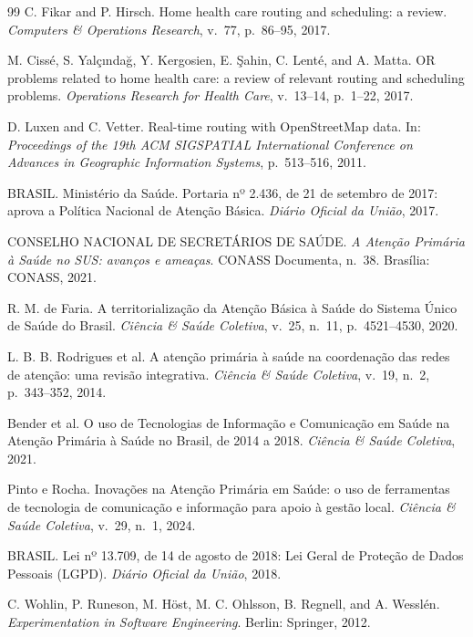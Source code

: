 \documentclass[11pt,a4paper]{article}
\begin{document}
\begin{thebibliography}{99}
C. Fikar and P. Hirsch.
Home health care routing and scheduling: a review. \textit{Computers \& Operations Research}, v.~77, p.~86--95, 2017.

M. Cissé, S. Yalçındağ, Y. Kergosien, E. Şahin, C. Lenté, and A. Matta.
OR problems related to home health care: a review of relevant routing and scheduling problems. \textit{Operations Research for Health Care}, v.~13--14, p.~1--22, 2017.

D. Luxen and C. Vetter.
Real-time routing with OpenStreetMap data. In: \textit{Proceedings of the 19th ACM SIGSPATIAL International Conference on Advances in Geographic Information Systems}, p.~513--516, 2011.

BRASIL. Ministério da Saúde.
Portaria nº 2.436, de 21 de setembro de 2017: aprova a Política Nacional de Atenção Básica. \textit{Diário Oficial da União}, 2017.

CONSELHO NACIONAL DE SECRETÁRIOS DE SAÚDE.
\textit{A Atenção Primária à Saúde no SUS: avanços e ameaças}. CONASS Documenta, n.~38. Brasília: CONASS, 2021.

R. M. de Faria.
A territorialização da Atenção Básica à Saúde do Sistema Único de Saúde do Brasil. \textit{Ciência \& Saúde Coletiva}, v.~25, n.~11, p.~4521--4530, 2020.

L. B. B. Rodrigues et al.
A atenção primária à saúde na coordenação das redes de atenção: uma revisão integrativa. \textit{Ciência \& Saúde Coletiva}, v.~19, n.~2, p.~343--352, 2014.

Bender et al.
O uso de Tecnologias de Informação e Comunicação em Saúde na Atenção Primária à Saúde no Brasil, de 2014 a 2018. \textit{Ciência \& Saúde Coletiva}, 2021.

Pinto e Rocha.
Inovações na Atenção Primária em Saúde: o uso de ferramentas de tecnologia de comunicação e informação para apoio à gestão local. \textit{Ciência \& Saúde Coletiva}, v.~29, n.~1, 2024.

BRASIL.
Lei nº 13.709, de 14 de agosto de 2018: Lei Geral de Proteção de Dados Pessoais (LGPD). \textit{Diário Oficial da União}, 2018.

C. Wohlin, P. Runeson, M. Höst, M. C. Ohlsson, B. Regnell, and A. Wesslén.
\textit{Experimentation in Software Engineering}. Berlin: Springer, 2012.

\end{thebibliography}
\end{document}
